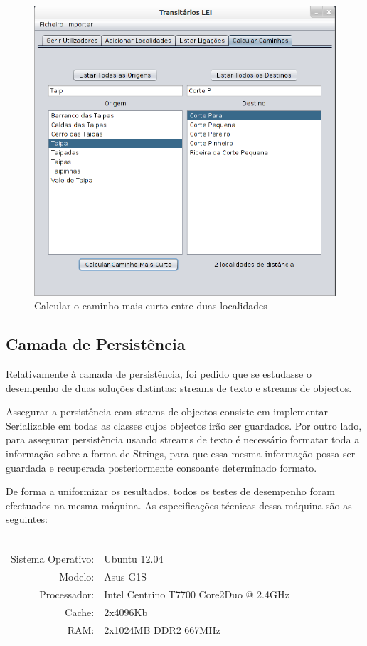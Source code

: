 \documentclass[a5paper,twocolumn, 11pt]{article}
\begin{document}
\begin{figure}[h!b!t!]
    \caption[Calcular Caminho mais Curto]{Calcular o caminho mais curto entre duas localidades}
    \centering
        \includegraphics[width=330pt]{interface_7.png}
\end{figure}

\newpage
\twocolumn
\subsection{Camada de Persistência}
Relativamente à camada de persistência, foi pedido que se estudasse o desempenho de duas soluções distintas: streams de texto e streams de objectos.

Assegurar a persistência com steams de objectos consiste em implementar Serializable em todas as classes cujos objectos irão ser guardados. Por outro lado, para assegurar persistência usando streams de texto é necessário formatar toda a informação sobre a forma de Strings, para que essa mesma informação possa ser guardada e recuperada posteriormente consoante determinado formato.

De forma a uniformizar os resultados, todos os testes de desempenho foram efectuados na mesma máquina. As especificações técnicas dessa máquina são as seguintes:\\
\\
\begin{tabular}{ | r  | p{2.8cm} | }
    \hline
    Sistema Operativo: & Ubuntu 12.04 \\
    Modelo: & Asus G1S \\
    Processador: & \vbox{Intel Centrino} T7700 \vbox{Core2Duo} @ 2.4GHz \\
    Cache: & \vbox{2x4096Kb}\\
    RAM: & 2x1024MB DDR2 667MHz\\ \hline
\end{tabular}\\
\\
\end{document}
